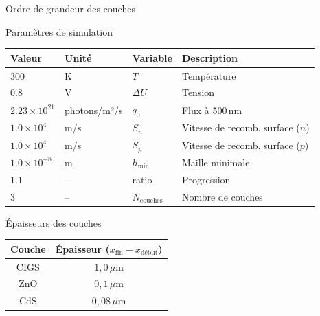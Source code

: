 \begin{frame}[t]{Ordre de grandeur des couches}
\begin{pcbanner}{Paramètres de simulation}
  \centering\scriptsize
  \renewcommand{\arraystretch}{1.2}
  \begin{tabular}{llll}
    \textbf{Valeur} & \textbf{Unité} & \textbf{Variable} & \textbf{Description} \\
    \hline
    $300$        & K              & $T$          & Température      \\
    $0.8$        & V              & $\Delta U$   & Tension          \\
    $2.23\times10^{21}$ & photons/m²/s & $q_0$   & Flux à 500\,nm   \\
    $1.0\times10^{4}$   & m/s      & $S_n$        & Vitesse de recomb. surface ($n$) \\
    $1.0\times10^{4}$   & m/s      & $S_p$        & Vitesse de recomb. surface ($p$) \\
    $1.0\times10^{-8}$  & m        & $h_{\min}$   & Maille minimale  \\
    $1.1$        & --             & ratio        & Progression      \\
    $3$          & --             & $N_{\mathrm{couches}}$ & Nombre de couches \\
  \end{tabular}
\end{pcbanner}
\begin{pcbanner}{Épaisseurs des couches}
  \centering\scriptsize
  \renewcommand{\arraystretch}{1.3}
  \begin{tabular}{cc}
    \textbf{Couche} & \textbf{Épaisseur} ($x_{\mathrm{fin}} - x_{\mathrm{début}}$) \\
    \hline
    CIGS & $1{,}0\,\mu$m  \\
    ZnO & $0{,}1\,\mu$m  \\
    CdS & $0{,}08\,\mu$m \\
  \end{tabular}
\end{pcbanner}
\end{frame}